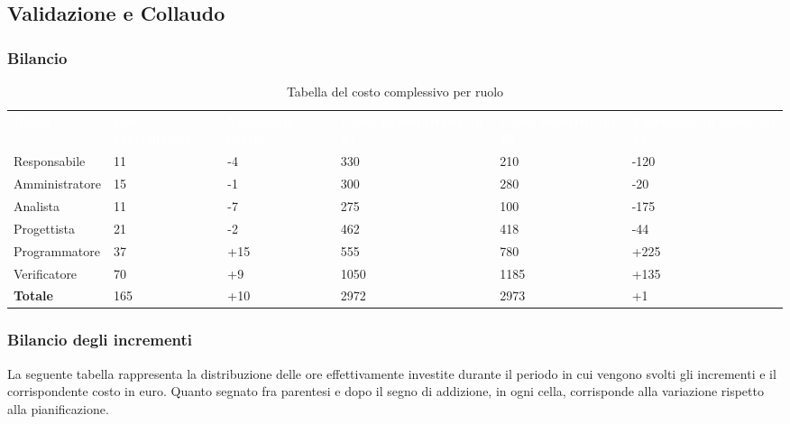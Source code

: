 \subsection{Validazione e Collaudo}
\subsubsection{Bilancio}

{
\renewcommand{\arraystretch}{2}
\begin{longtable}[h]{ C{2.5cm} C{2.5cm} C{2.5cm} C{2.5cm} C{1.5cm} C{2.5cm}}
\caption{Tabella del costo complessivo per ruolo}\\

\textcolor{white}{\textbf{Ruolo}} & 
\textcolor{white}{\textbf{Ore preventivate}} & 
\textcolor{white}{\textbf{Variazione oraria}} & 
\textcolor{white}{\textbf{Costo preventivato (in \euro{})}} & 
\textcolor{white}{\textbf{Costo effettivo (in \euro{})}} & 
\textcolor{white}{\textbf{Variazione di costo (in \euro{})}}\\	
	
Responsabile    &  11 &  -4 &  330 &  210 & -120 \\
Amministratore  &  15 &  -1 &  300 &  280 &  -20 \\
Analista        &  11 &  -7 &  275 &  100 & -175 \\
Progettista     &  21 &  -2 &  462 &  418 &  -44 \\
Programmatore   &  37 & +15 &  555 &  780 & +225 \\
Verificatore    &  70 &  +9 & 1050 & 1185 & +135 \\
\textbf{Totale} & 165 & +10 & 2972 & 2973 &   +1 \\	

\end{longtable}
}

\subsubsection{Bilancio degli incrementi}
La seguente tabella rappresenta la distribuzione delle ore effettivamente investite durante il periodo in cui vengono svolti gli incrementi e il corrispondente costo in euro.
Quanto segnato fra parentesi e dopo il segno di addizione, in ogni cella, corrisponde alla variazione rispetto alla pianificazione.

